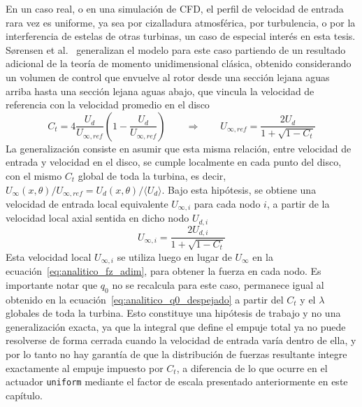En un caso real, o en una simulación de CFD, el perfil de velocidad de entrada rara vez es uniforme, ya sea por cizalladura atmosférica, por turbulencia, o por la interferencia de estelas de otras turbinas, un caso de especial interés en esta tesis. Sørensen et al.~\citep{sorensen2020} generalizan el modelo para este caso partiendo de un resultado adicional de la teoría de momento unidimensional clásica, obtenido considerando un volumen de control que envuelve al rotor desde una sección lejana aguas arriba hasta una sección lejana aguas abajo, que vincula la velocidad de referencia con la velocidad promedio en el disco
\begin{equation}
C_t = 4\frac{U_d}{U_{\infty,ref}}\left(1 - \frac{U_d}{U_{\infty,ref}}\right)
\qquad\Rightarrow\qquad
U_{\infty,ref} = \frac{2 U_d}{1 + \sqrt{1 - C_t}}
\label{eq:analitico_Uinf}
\end{equation}
La generalización consiste en asumir que esta misma relación, entre velocidad de entrada y velocidad en el disco, se cumple localmente en cada punto del disco, con el mismo $C_t$ global de toda la turbina, es decir, $U_\infty(x,\theta)/U_{\infty,ref} = U_{d}(x,\theta)/\langle U_d\rangle$. Bajo esta hipótesis, se obtiene una velocidad de entrada local equivalente $U_{\infty,i}$ para cada nodo $i$, a partir de la velocidad local axial sentida en dicho nodo $U_{d,i}$
\begin{equation}
U_{\infty,i} = \frac{2 U_{d,i}}{1+\sqrt{1-C_t}}
\label{eq:analitico_Uinfi}
\end{equation}
Esta velocidad local $U_{\infty,i}$ se utiliza luego en lugar de $U_\infty$ en la ecuación~\ref{eq:analitico_fz_adim}, para obtener la fuerza en cada nodo. Es importante notar que $q_0$ no se recalcula para este caso, permanece igual al obtenido en la ecuación~\ref{eq:analitico_q0_despejado} a partir del $C_t$ y el $\lambda$ globales de toda la turbina. Esto constituye una hipótesis de trabajo y no una generalización exacta, ya que la integral que define el empuje total ya no puede resolverse de forma cerrada cuando la velocidad de entrada varía dentro de ella, y por lo tanto no hay garantía de que la distribución de fuerzas resultante integre exactamente al empuje impuesto por $C_t$, a diferencia de lo que ocurre en el actuador \texttt{uniform} mediante el factor de escala presentado anteriormente en este capítulo.


